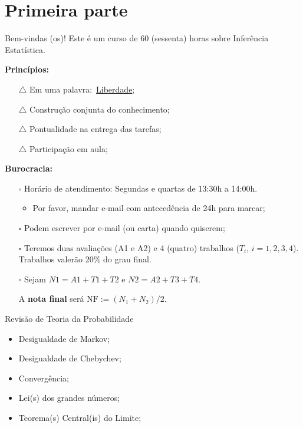 \section*{Primeira parte}
\begin{frame}[t,plain]
\titlepage
\end{frame}
\begin{frame}{Bem-vindas (os)!}
Este é um curso de 60 (sessenta) horas sobre Inferência Estatística.

\textbf{Princípios:}
\begin{itemize}
  \item[$\triangle$] Em uma palavra:~\underline{Liberdade};
  \item[$\triangle$] Construção conjunta do conhecimento;
  \item[$\triangle$] Pontualidade na entrega das tarefas;
  \item[$\triangle$] Participação em aula;
\end{itemize}

\textbf{Burocracia:}
\begin{itemize}
 \item[$\square$] Horário de atendimento: Segundas e quartas de 13:30h a 14:00h.
 \begin{itemize}
  \item  Por favor, mandar e-mail com antecedência de 24h para marcar;
  \end{itemize} 
 \item[$\square$] Podem escrever por e-mail (ou carta) quando quiserem;
 \item[$\square$] Teremos duas avaliações (A1 e A2) e 4 (quatro) trabalhos ($T_i$, $i = 1,2,3,4$).
 Trabalhos valerão 20\% do grau final.
 \item[$\square$] Sejam $N1 = A1 + T1 + T2$ e $N2 = A2 + T3 + T4$.
 
A \textbf{nota final} será $\text{NF} := (N_1 + N_2)/2$.
\end{itemize}
\end{frame}
\begin{frame}{Revisão de Teoria da Probabilidade}
\begin{itemize}
 \item Desigualdade de Markov;
 \item Desigualdade de Chebychev;
  \item Convergência;
 \item Lei(s) dos grandes números;
 \item Teorema(s) Central(is) do Limite;
\end{itemize}
\end{frame}
